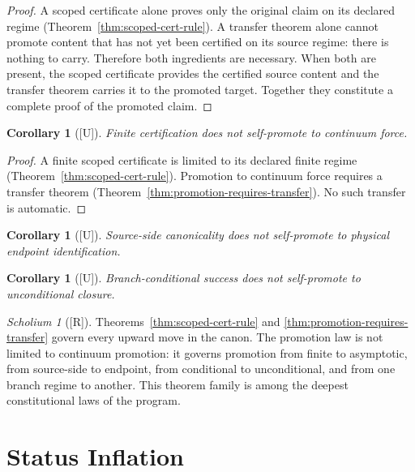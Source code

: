 \documentclass[12pt,oneside]{amsbook}
\theoremstyle{plain}
\newtheorem{corollary}[theorem]{Corollary}
\theoremstyle{definition}
\theoremstyle{remark}
\newtheorem{scholium}[theorem]{Scholium}
\newcommand{\status}[1]{\textup{[#1]}}
\begin{document}
\begin{proof}
A scoped certificate alone proves only the original claim on its
declared regime (Theorem~\ref{thm:scoped-cert-rule}).  A transfer
theorem alone cannot promote content that has not yet been certified
on its source regime: there is nothing to carry.  Therefore both
ingredients are necessary.  When both are present, the scoped
certificate provides the certified source content and the transfer
theorem carries it to the promoted target.  Together they constitute
a complete proof of the promoted claim.
\end{proof}

\begin{corollary}[\status{U}]\label{cor:finite-no-continuum}
Finite certification does not self-promote to continuum force.
\end{corollary}

\begin{proof}
A finite scoped certificate is limited to its declared finite regime
(Theorem~\ref{thm:scoped-cert-rule}).  Promotion to continuum force
requires a transfer theorem (Theorem~\ref{thm:promotion-requires-transfer}).
No such transfer is automatic.
\end{proof}

\begin{corollary}[\status{U}]\label{cor:source-no-endpoint}
Source-side canonicality does not self-promote to physical endpoint
identification.
\end{corollary}

\begin{corollary}[\status{U}]\label{cor:conditional-no-unconditional}
Branch-conditional success does not self-promote to unconditional
closure.
\end{corollary}

\begin{scholium}[\status{R}]\label{sch:promotion-law-universal}
Theorems~\ref{thm:scoped-cert-rule} and
\ref{thm:promotion-requires-transfer} govern every upward move in the
canon.  The promotion law is not limited to continuum promotion: it
governs promotion from finite to asymptotic, from source-side to
endpoint, from conditional to unconditional, and from one branch
regime to another.  This theorem family is among the deepest
constitutional laws of the program.
\end{scholium}

\section{Status Inflation}
\end{document}
